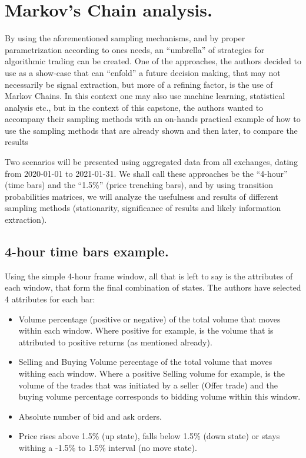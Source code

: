 \section{Markov’s Chain analysis.}

By using the aforementioned sampling mechanisms, and by proper parametrization according to ones needs, an “umbrella” of strategies for algorithmic trading can be created. One of the approaches, the authors decided to use as a show-case that can “enfold” a future decision making, that may not necessarily be signal extraction, but more of a refining factor, is the use of Markov Chains. In this context one may also use machine learning, statistical analysis etc., but in the context of this capstone, the authors wanted to accompany their sampling methods with an on-hands practical example of how to use the sampling methods that are already shown and then later, to compare the results 

Two scenarios will be presented using aggregated data from all exchanges, dating from 2020-01-01 to 2021-01-31. We shall call these approaches be the “4-hour” (time bars) and the “1.5\%” (price trenching bars), and by using transition probabilities matrices, we will analyze the usefulness and results of different sampling methods (stationarity, significance of results and likely information extraction). 

\subsection{4-hour time bars example.}

Using the simple 4-hour frame window, all that is left to say is the attributes of each window, that form the final combination of states. The authors have selected 4 attributes for each bar:

\begin{itemize}
\item Volume percentage (positive or negative) of the total volume that moves within each window. Where positive for example, is the volume that is attributed to positive returns (as mentioned already).
\item Selling and Buying Volume percentage of the total volume that moves withing each window. Where a positive Selling volume for example, is the volume of the trades that was initiated by a seller (Offer trade) and the buying volume percentage corresponds to bidding volume within this window.
\item Absolute number of bid and ask orders.
\item Price rises above 1.5\% (up state), falls below 1.5\% (down state) or stays withing a -1.5\% to 1.5\% interval (no move state).
\end{itemize}

